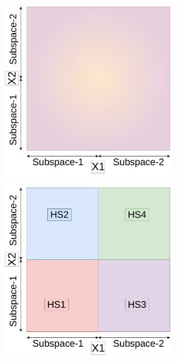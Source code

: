 \begin{figure}[H]
	\centering
	\begin{subfigure}{0.95\textwidth}
		\centering
		\includegraphics[scale=0.33]{figures/dbo/dbo-01.pdf}
		\caption{}
		\label{fig:dsbo-a}
	\end{subfigure}
	\begin{subfigure}{0.45\textwidth}
		\centering
		\includegraphics[scale=0.33]{figures/dbo/dbo-02.pdf}

\end{subfigure}
\end{figure}
